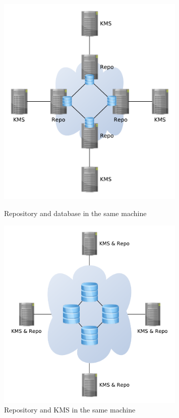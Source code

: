 \begin{figure}[!htb]
\centering
\begin{minipage}[b]{0.45\linewidth}
  \centering
  \includegraphics[width=0.8\textwidth]{figures/scale1.pdf}
  \caption{Repository and database in the same machine}
  \label{fig:scale1}
\end{minipage}
\quad
\begin{minipage}[b]{0.45\linewidth}
  \centering
  \includegraphics[width=0.8\textwidth]{figures/scale2.pdf}
  \caption{Repository and KMS in the same machine}
  \label{fig:scale2}
\end{minipage}
\end{figure}


